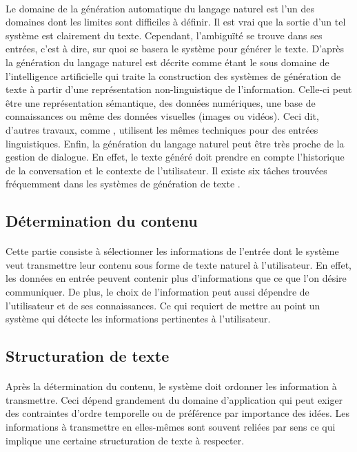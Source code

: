 	\paragraph{}
	Le domaine de la génération automatique du langage naturel est l’un des domaines dont les limites sont difficiles à définir\cite{evans2002}. Il est vrai que la sortie d’un tel système est clairement du texte. Cependant, l’ambiguïté se trouve dans ses entrées, c’est à dire, sur quoi se basera le système pour générer le texte. D’après \cite{Reiter:1997} la génération du langage naturel est décrite comme étant le sous domaine de l’intelligence artificielle qui traite la construction des systèmes de génération de texte à partir d’une représentation non-linguistique de l’information. Celle-ci peut être une représentation sémantique, des données numériques, une base de connaissances ou même des données visuelles (images ou vidéos). Ceci dit, d’autres travaux, comme \cite{Labbé2012}, utilisent les mêmes techniques pour des entrées linguistiques. Enfin, la génération du langage naturel peut être très proche de la gestion de dialogue\cite{Dethlefs2014}. En effet, le texte généré doit prendre en compte l’historique de la conversation et le contexte de l’utilisateur.\newline
	Il existe six tâches trouvées fréquemment dans les systèmes de génération de texte \cite{Reiter:1997}.
	
	\subsection{Détermination du contenu}
	\paragraph{}
	Cette partie consiste à sélectionner les informations de l’entrée dont le système veut transmettre leur contenu sous forme de texte naturel à l’utilisateur. En effet, les données en entrée peuvent contenir plus d’informations que ce que l’on désire communiquer\cite{Yu:2007}. De plus, le choix de l'information peut aussi dépendre de l’utilisateur et de ses connaissances\cite{Dethlefs2014}. Ce qui requiert de mettre au point un système qui détecte les informations pertinentes à l’utilisateur.
	\subsection{Structuration de texte}
	\paragraph{}
	Après la détermination du contenu, le système doit ordonner les information à transmettre. Ceci dépend grandement du domaine d’application qui peut exiger des contraintes d’ordre temporelle ou de préférence par importance des idées. Les informations à transmettre en elles-mêmes sont souvent reliées par sens ce qui implique une certaine structuration de texte à respecter.\newpage
